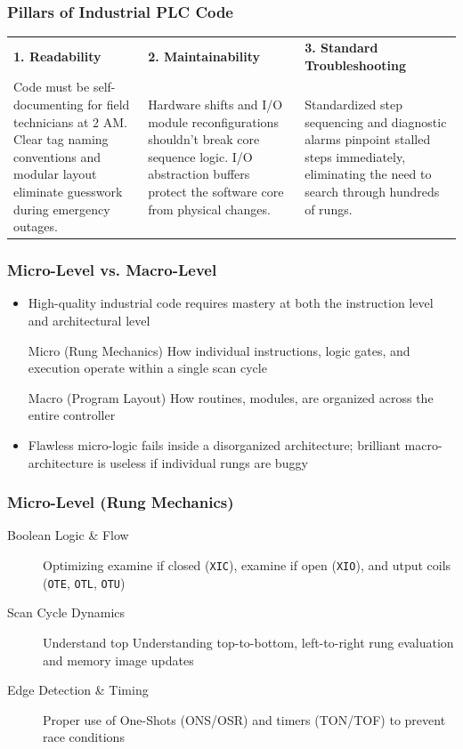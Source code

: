 \begin{frame}
    \frametitle{Pillars of Industrial PLC Code}

    \begin{table}
        \centering
        \begin{tabular}{L{2in}L{2in}L{2in}}
            \textcolor{BakerADARed}{\textbf{1. Readability}} & \textcolor{BakerADARed}{\textbf{2. Maintainability}} & \textcolor{BakerADARed}{\textbf{3. Standard Troubleshooting}}\\
            Code must be self-documenting for field technicians at 2 AM. Clear tag naming conventions and modular layout eliminate guesswork during emergency outages. & Hardware shifts and I/O module reconfigurations shouldn't break core sequence logic. I/O abstraction buffers protect the software core from physical changes. & Standardized step sequencing and diagnostic alarms pinpoint stalled steps immediately, eliminating the need to search through hundreds of rungs.\\
        \end{tabular}
    \end{table}
\end{frame}

\begin{frame}
    \frametitle{Micro-Level vs. Macro-Level}

    \begin{itemize}
        \item High-quality industrial code requires mastery at both the instruction level and architectural level
        \item[Micro (Rung Mechanics)] How individual instructions, logic gates, and execution operate within a single scan cycle
        \item[Macro (Program Layout)] How routines, modules, are organized across the entire controller
        \item Flawless micro-logic fails inside a disorganized architecture; brilliant macro-architecture is useless if individual rungs are buggy
    \end{itemize}
\end{frame}

\begin{frame}
    \frametitle{Micro-Level (Rung Mechanics)}

    \begin{description}
        \item[Boolean Logic \& Flow] Optimizing examine if closed (\texttt{XIC}), examine if open (\texttt{XIO}), and utput coils (\texttt{OTE}, \texttt{OTL}, \texttt{OTU})
        \item[Scan Cycle Dynamics] Understand top Understanding top-to-bottom, left-to-right rung evaluation and memory image updates
        \item[Edge Detection \& Timing] Proper use of One-Shots (ONS/OSR) and timers (TON/TOF) to prevent race conditions
    \end{description}
\end{frame}

